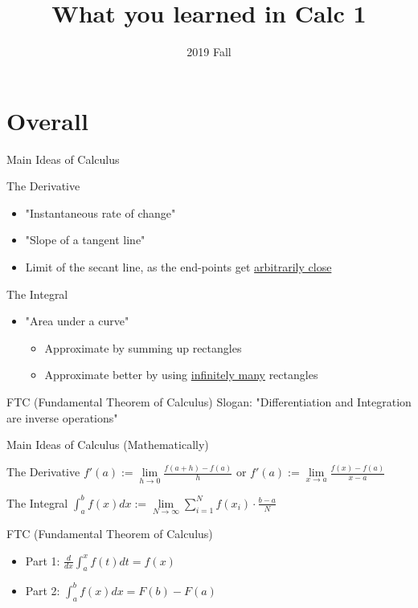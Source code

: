 \documentclass{beamer}
\title{What you learned in Calc 1}
\date{2019 Fall}
\begin{document}
\frame{\titlepage}


\section{Overall}
\begin{frame}[label={sec:orgb61fcc0}]{Main Ideas of Calculus}
\begin{block}{The Derivative}
\begin{itemize}
\item "Instantaneous rate of change"
\item "Slope of a tangent line"
\item Limit of the secant line, as the end-points get \uline{arbitrarily close}
\end{itemize}
\end{block}
\begin{block}{The Integral}
\begin{itemize}
\item "Area under a curve"
\begin{itemize}
\item Approximate by summing up rectangles
\item Approximate better by using \uline{infinitely many} rectangles
\end{itemize}
\end{itemize}
\end{block}
\begin{block}{FTC (Fundamental Theorem of Calculus)}
Slogan: "Differentiation and Integration are inverse operations"
\end{block}
\end{frame}

\begin{frame}[label={sec:org833f693}]{Main Ideas of Calculus (Mathematically)}

\begin{block}{The Derivative}
\(f'(a) := \lim\limits_{h\to0} \frac{f(a+h) - f(a)}{h}\)
or 
\(f'(a) := \lim\limits_{x\to a} \frac{f(x) - f(a)}{x-a}\)
\end{block}

\begin{block}{The Integral}
\(\int_a^b f(x) dx := \lim\limits_{N\to\infty} \sum\limits_{i=1}^N f(x_i) \cdot \frac{b-a}{N}\)
\end{block}

\begin{block}{FTC (Fundamental Theorem of Calculus)}
\begin{itemize}
\item Part 1: \(\frac{d}{dx} \int_a^x f(t) dt = f(x)\)
\item Part 2: \(\int_a^b f(x) dx = F(b) - F(a)\)
\end{itemize}
\end{block}
\end{frame}
\end{document}
